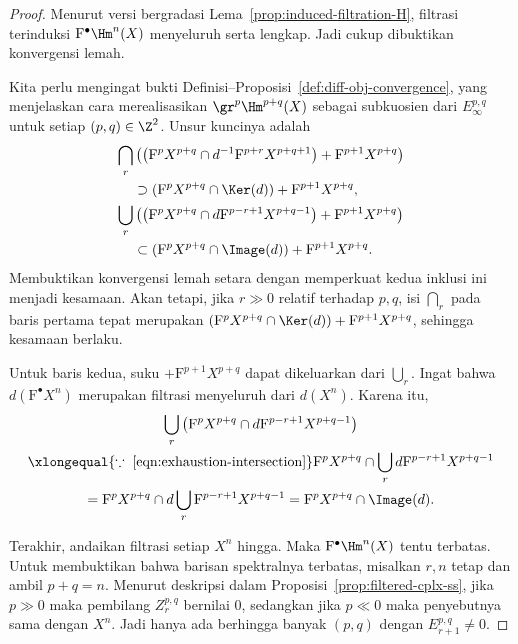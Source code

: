 \begin{proof}
	Menurut versi bergradasi Lema~\ref{prop:induced-filtration-H}, filtrasi
	terinduksi $\mathrm{F}^\bullet\Hm^n(X)$ menyeluruh serta lengkap. Jadi cukup
	dibuktikan konvergensi lemah.

	Kita perlu mengingat bukti
	Definisi--Proposisi~\ref{def:diff-obj-convergence}, yang menjelaskan cara
	merealisasikan $\gr^p\Hm^{p+q}(X)$ sebagai subkuosien dari
	$E_\infty^{p,q}$ untuk setiap $(p,q)\in\Z^2$. Unsur kuncinya adalah
	\begin{equation*}\begin{split}
		\bigcap_r&\left(\left(\mathrm{F}^pX^{p+q}\cap
		d^{-1}\mathrm{F}^{p+r}X^{p+q+1}\right)+\mathrm{F}^{p+1}X^{p+q}\right)
		\\
		&\supset(\mathrm{F}^pX^{p+q}\cap\Ker(d))+\mathrm{F}^{p+1}X^{p+q},\\
		\bigcup_r&\left(\left(\mathrm{F}^pX^{p+q}\cap
		d\mathrm{F}^{p-r+1}X^{p+q-1}\right)+\mathrm{F}^{p+1}X^{p+q}\right)
		\\
		&\subset(\mathrm{F}^pX^{p+q}\cap\Image(d))+\mathrm{F}^{p+1}X^{p+q}.
	\end{split}\end{equation*}
	Membuktikan konvergensi lemah setara dengan memperkuat kedua inklusi ini
	menjadi kesamaan. Akan tetapi, jika $r\gg0$ relatif terhadap $p,q$, isi
	$\bigcap_r$ pada baris pertama tepat merupakan
	$(\mathrm{F}^pX^{p+q}\cap\Ker(d))+\mathrm{F}^{p+1}X^{p+q}$, sehingga
	kesamaan berlaku.

	Untuk baris kedua, suku $+\mathrm{F}^{p+1}X^{p+q}$ dapat dikeluarkan dari
	$\bigcup_r$. Ingat bahwa $d(\mathrm{F}^\bullet X^n)$ merupakan filtrasi
	menyeluruh dari $d(X^n)$. Karena itu,
	\begin{multline*}
		\bigcup_r\left(\mathrm{F}^pX^{p+q}\cap
		d\mathrm{F}^{p-r+1}X^{p+q-1}\right)\\
		\xlongequal{\because\;\text{\eqref{eqn:exhaustion-intersection}}}
		\mathrm{F}^pX^{p+q}\cap\bigcup_r
		d\mathrm{F}^{p-r+1}X^{p+q-1}\\
		=\mathrm{F}^pX^{p+q}\cap d\bigcup_r
		\mathrm{F}^{p-r+1}X^{p+q-1}
		=\mathrm{F}^pX^{p+q}\cap\Image(d).
	\end{multline*}

	Terakhir, andaikan filtrasi setiap $X^n$ hingga. Maka
	$\mathrm{F}^\bullet\Hm^n(X)$ tentu terbatas. Untuk membuktikan bahwa
	barisan spektralnya terbatas, misalkan $r,n$ tetap dan ambil $p+q=n$. Menurut
	deskripsi dalam Proposisi~\ref{prop:filtered-cplx-ss}, jika $p\gg0$ maka
	pembilang $Z_r^{p,q}$ bernilai $0$, sedangkan jika $p\ll0$ maka
	penyebutnya sama dengan $X^n$. Jadi hanya ada berhingga banyak
	$(p,q)$ dengan $E_{r+1}^{p,q}\neq0$.
\end{proof}


